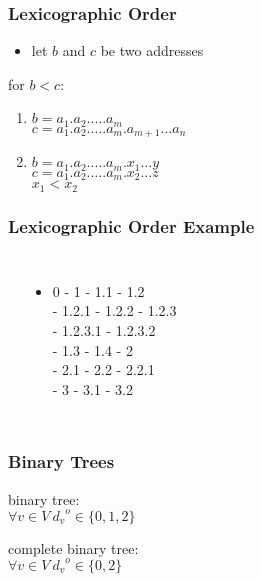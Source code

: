 \documentclass[dvipsnames]{beamer}
\begin{document}
\begin{frame}
  \frametitle{Lexicographic Order}

  \begin{itemize}
    \item let $b$ and $c$ be two addresses
  \end{itemize}

  \begin{definition}
    for \alert{$b < c$}:
    \begin{enumerate}
      \item $b=a_1.a_2. \dots .a_m$\\
        $c=a_1.a_2. \dots .a_m.a_{m+1} \dots a_n$
      \pause
      \item $b=a_1.a_2. \dots .a_m.x_1 \dots y$\\
        $c=a_1.a_2. \dots .a_m.x_2 \dots z$\\
        $x_1 < x_2$
    \end{enumerate}
  \end{definition}
\end{frame}

\begin{frame}
  \frametitle{Lexicographic Order Example}

  \begin{example}
    \begin{columns}
      \begin{center}
      \end{center}

      \pause
      \begin{itemize}
        \item 0 - 1 - 1.1 - 1.2\\
          - 1.2.1 - 1.2.2 - 1.2.3\\
          - 1.2.3.1 - 1.2.3.2\\
          - 1.3 - 1.4 - 2\\
          - 2.1 - 2.2 - 2.2.1\\
          - 3 - 3.1 - 3.2
      \end{itemize}
    \end{columns}
  \end{example}
\end{frame}

\begin{frame}
  \frametitle{Binary Trees}

  \begin{definition}
    \alert{binary tree}:\\
    $\forall v \in V~{d_v}^o \in \{0,1,2\}$
  \end{definition}

  \pause
  \begin{definition}
    \alert{complete binary tree}:\\
    $\forall v \in V~{d_v}^o \in \{0,2\}$
  \end{definition}
\end{frame}
\end{document}

